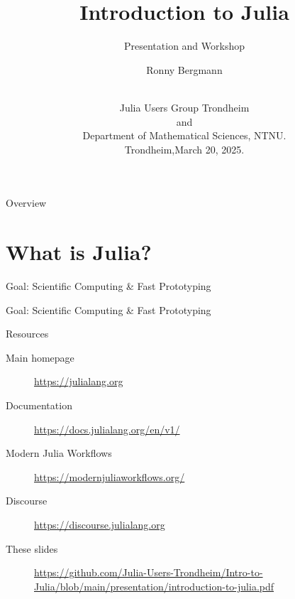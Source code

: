 \documentclass[aspectratio=169, handout]{beamer}
\title{Introduction to Julia}
\subtitle{Presentation and Workshop}
\author[Ronny Bergmann]{\large{Ronny Bergmann}\\[\baselineskip]\ }
\date[March 20, 2025]{Julia Users Group Trondheim\\[-.1\baselineskip]{\footnotesize and}\\[-.1\baselineskip]
    Department of Mathematical Sciences, NTNU.\\[\baselineskip]
    Trondheim,\hfill March 20, 2025.}
\begin{document}
	\maketitle
    \begin{frame}{Overview}
        \tableofcontents
    \end{frame}
    \section{What is Julia?}
    \begin{frame}{Goal: Scientific Computing \& Fast Prototyping}
    \end{frame}
    \begin{frame}{Goal: Scientific Computing \& Fast Prototyping}
    \end{frame}
    \begin{frame}{Resources}
        \begin{description}
            \item[Main homepage] \url{https://julialang.org}
            \item[Documentation] \url{https://docs.julialang.org/en/v1/}
            \item[Modern Julia Workflows] \url{https://modernjuliaworkflows.org/}
            \item[Discourse] \url{https://discourse.julialang.org}
            \item[These slides] \url{https://github.com/Julia-Users-Trondheim/Intro-to-Julia/blob/main/presentation/introduction-to-julia.pdf}
        \end{description}
    \end{frame}
\end{document}
